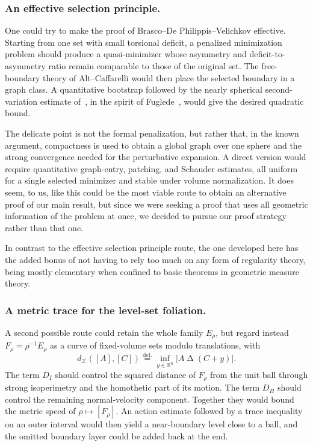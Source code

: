 \documentclass[11pt]{amsart}
\theoremstyle{plain}
\theoremstyle{definition}
\newcommand{\eqdef}{\overset{\text{def.}}{=}}
\begin{document}
\subsubsection{An effective selection principle.}
One could try to make the proof of Brasco--De Philippis--Velichkov
\cite{brasco2015faber} effective. Starting from one set with small torsional
deficit, a penalized minimization problem should produce a quasi-minimizer
whose asymmetry and deficit-to-asymmetry ratio remain comparable to those of
the original set. The free-boundary theory of Alt--Caffarelli
\cite{AltCaffarelli1981} would then place the selected boundary in a graph
class. A quantitative bootstrap followed by the nearly spherical
second-variation estimate of~\cite{brasco2015faber}, in the spirit of
Fuglede~\cite{Fuglede1989}, would give the desired quadratic bound.

The delicate point is not the formal penalization, but rather that, in the known argument,
compactness is used to obtain a global graph over one sphere and the strong convergence needed for the perturbative expansion. A direct version would require quantitative graph-entry, patching, and Schauder estimates, all uniform for a single selected minimizer and stable under volume normalization. It does seem, to us, like this could be the most viable route to obtain an alternative proof of our main result, but since we were seeking a proof that uses all geometric information of the problem at once, we decided to pursue our proof strategy rather than that one. 

In contrast to the effective selection principle route, the one developed here has the added bonus of not having to rely too much on any form of regularity theory, being mostly elementary when confined to basic theorems in geometric measure theory. 

\subsubsection{A metric trace for the level-set foliation.}
A second possible route could retain the whole family $E_\rho$, but regard instead
$F_\rho=\rho^{-1}E_\rho$ as a curve of fixed-volume sets modulo
translations, with
\[
 d_{\mathcal X}([A],[C])
 \eqdef \inf_{y\in\mathbb R^n}|A\mathbin\Delta(C+y)|.
\]
The term $D_I$ should control the squared distance of $F_\rho$ from the unit
ball through strong isoperimetry and the homothetic part of its motion. The
term $D_H$ should control the remaining normal-velocity component. Together
they would bound the metric speed of $\rho\mapsto[F_\rho]$. An action
estimate followed by a trace inequality on an outer interval would then
yield a near-boundary level close to a ball, and the omitted boundary layer
could be added back at the end.
\end{document}
